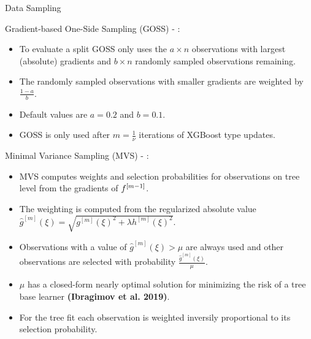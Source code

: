 \begin{vbframe}{Data Sampling}

Gradient-based One-Side Sampling (GOSS) - :

\lz

\begin{itemize}
  \item To evaluate a split GOSS only uses the $a \times n$ observations with largest (absolute) gradients and $b \times n$ randomly sampled observations remaining.
  \item The randomly sampled observations with smaller gradients are weighted by $\frac{1 - a}{b}$.
  \item Default values are $a=0.2$ and $b=0.1$.
  \item GOSS is only used after $m=\frac{1}{\nu}$ iterations of XGBoost type updates.
\end{itemize}

\framebreak

Minimal Variance Sampling (MVS) - :

\lz

\begin{itemize}
  \item MVS computes weights and selection probabilities for observations on tree level from the gradients of $f^{[m-1]}$.
  \item The weighting is computed from the regularized absolute value $\hat{g}^{[m]}(\xi)=\sqrt{g^{[m]}(\xi)^2 + \lambda h^{[m]}(\xi)^2}$.
  \item Observations with a value of $\hat{g}^{[m]}(\xi) > \mu$ are always used and other observations are selected with probability $\frac{\hat{g}^{[m]}(\xi)}{\mu}$.
  \item $\mu$ has a closed-form nearly optimal solution for minimizing the risk of a tree base learner \textbf{(Ibragimov et al. 2019)}.
  \item For the tree fit each observation is weighted inversily proportional to its selection probability.
\end{itemize}

\end{vbframe}


